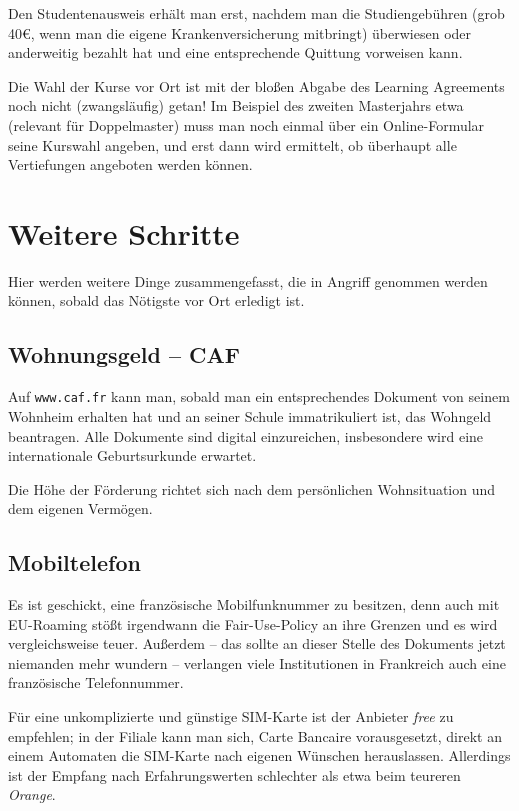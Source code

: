 \documentclass[11pt,a4paper]{article}
\begin{document}
	Den Studentenausweis erhält man erst, nachdem man die Studiengebühren (grob 40€, wenn man die eigene Krankenversicherung mitbringt) überwiesen oder anderweitig bezahlt hat und eine entsprechende Quittung vorweisen kann.
	
	Die Wahl der Kurse vor Ort ist mit der bloßen Abgabe des Learning Agreements noch nicht (zwangsläufig) getan! Im Beispiel des zweiten Masterjahrs etwa (relevant für Doppelmaster) muss man noch einmal über ein Online-Formular seine Kurswahl angeben, und erst dann wird ermittelt, ob überhaupt alle Vertiefungen angeboten werden können.
	
	\newpage
	\section{Weitere Schritte}
	
	Hier werden weitere Dinge zusammengefasst, die in Angriff genommen werden können, sobald das Nötigste vor Ort erledigt ist.
	
	\subsection{Wohnungsgeld -- CAF}
	
	Auf \texttt{www.caf.fr} kann man, sobald man ein entsprechendes Dokument von seinem Wohnheim erhalten hat und an seiner Schule immatrikuliert ist, das Wohngeld beantragen. Alle Dokumente sind digital einzureichen, insbesondere wird eine internationale Geburtsurkunde erwartet.
	
	Die Höhe der Förderung richtet sich nach dem persönlichen Wohnsituation und dem eigenen Vermögen.
	
	\subsection{Mobiltelefon}
	
	Es ist geschickt, eine französische Mobilfunknummer zu besitzen, denn auch mit EU-Roaming stößt irgendwann die Fair-Use-Policy an ihre Grenzen und es wird vergleichsweise teuer. Außerdem -- das sollte an dieser Stelle des Dokuments jetzt niemanden mehr wundern -- verlangen viele Institutionen in Frankreich auch eine französische Telefonnummer. 
	
	Für eine unkomplizierte und günstige SIM-Karte ist der Anbieter \emph{free} zu empfehlen; in der Filiale kann man sich, Carte Bancaire vorausgesetzt, direkt an einem Automaten die SIM-Karte nach eigenen Wünschen herauslassen. Allerdings ist der Empfang nach Erfahrungswerten schlechter als etwa beim teureren \emph{Orange}.
	
\end{document}
